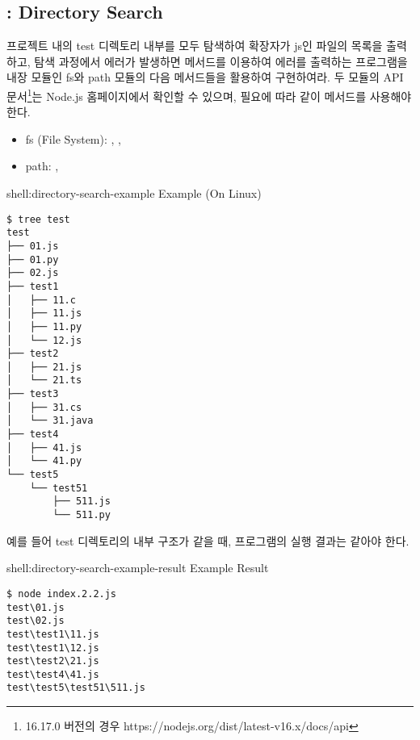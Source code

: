 \subsection*{: Directory Search}

프로젝트 내의 test 디렉토리 내부를 모두 탐색하여 확장자가 js인 파일의 목록을 출력하고, 탐색 과정에서 에러가 발생하면  메서드를 이용하여 에러를 출력하는 프로그램을 내장 모듈인 fs와 path 모듈의 다음 메서드들을 활용하여 구현하여라. 두 모듈의 API 문서\footnote{16.17.0 버전의 경우 https://nodejs.org/dist/latest-v16.x/docs/api}는 Node.js 홈페이지에서 확인할 수 있으며, 필요에 따라 \과 같이  메서드를 사용해야 한다.

\begin{itemize}
    \item fs (File System): , , 
    \item path: , 
\end{itemize}

\begin{shellenv}{shell:directory-search-example}{ Example (On Linux)}\begin{verbatim}
$ tree test
test
├── 01.js
├── 01.py
├── 02.js
├── test1
│   ├── 11.c
│   ├── 11.js
│   ├── 11.py
│   └── 12.js
├── test2
│   ├── 21.js
│   └── 21.ts
├── test3
│   ├── 31.cs
│   └── 31.java
├── test4
│   ├── 41.js
│   └── 41.py
└── test5
    └── test51
        ├── 511.js
        └── 511.py
\end{verbatim}
\end{shellenv}

예를 들어 test 디렉토리의 내부 구조가 \과 같을 때, 프로그램의 실행 결과는 \와 같아야 한다.

\begin{shellenv}{shell:directory-search-example-result}{ Example Result}\begin{verbatim}
$ node index.2.2.js
test\01.js
test\02.js
test\test1\11.js
test\test1\12.js
test\test2\21.js
test\test4\41.js
test\test5\test51\511.js
\end{verbatim}
\end{shellenv}
